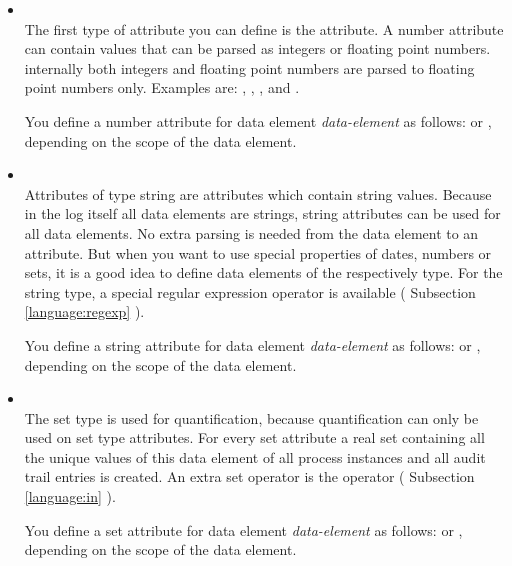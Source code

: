 \begin{itemize}
    \item {}\\
    The first type of attribute you can define is the  attribute. A
    number attribute can contain values that can be parsed as integers or floating
    point numbers. internally both integers and floating point numbers are
    parsed to floating point numbers only. Examples are: ,
    , ,  and .

    You define a number attribute for data element \textit{data-element} as follows:
     or , depending
    on the scope of the data element.

    \item {}\\
    Attributes of type string are attributes which contain string values. Because
    in the log itself all data elements are strings, string attributes can
    be used for all data elements. No extra parsing is needed from the data
    element to an attribute. But when you want to use special properties of dates,
    numbers or sets, it is a good idea to define data elements of the respectively
    type. For the string type, a special regular expression operator is
    available ( Subsection \ref{language:regexp} ).

    You define a string attribute for data element \textit{data-element} as
    follows:  or ,
    depending on the scope of the data element.

    \item {}\\
    The set type is used for quantification, because quantification can only be used on set type
    attributes. For every set attribute a real set containing all the
    unique values of this data element of all process instances and all audit
    trail entries is created. An extra set operator is the  operator
    ( Subsection \ref{language:in} ).
    
    You define a set attribute for data element \textit{data-element} as
    follows:  or ,
    depending on the scope of the data element.


\end{itemize}

